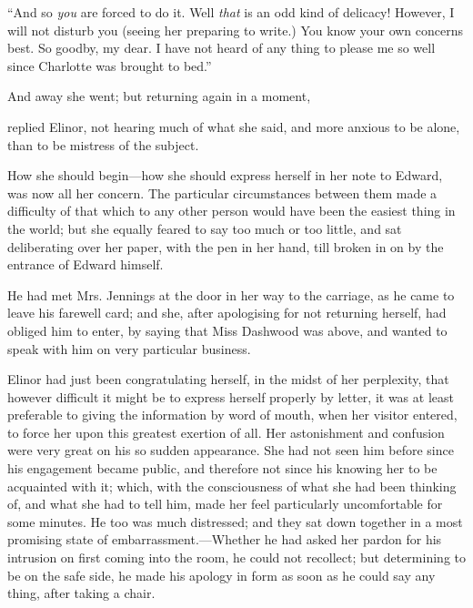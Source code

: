 “And so {\em you} are forced to do it. Well {\em that} is an odd kind of delicacy! However, I will not disturb you (seeing her preparing to write.) You know your own concerns best. So goodby, my dear. I have not heard of any thing to please me so well since Charlotte was brought to bed.”

And away she went; but returning again in a moment,


 replied Elinor, not hearing much of what she said, and more anxious to be alone, than to be mistress of the subject.

How she should begin---how she should express herself in her note to Edward, was now all her concern. The particular circumstances between them made a difficulty of that which to any other person would have been the easiest thing in the world; but she equally feared to say too much or too little, and sat deliberating over her paper, with the pen in her hand, till broken in on by the entrance of Edward himself.

He had met Mrs. Jennings at the door in her way to the carriage, as he came to leave his farewell card; and she, after apologising for not returning herself, had obliged him to enter, by saying that Miss Dashwood was above, and wanted to speak with him on very particular business.

Elinor had just been congratulating herself, in the midst of her perplexity, that however difficult it might be to express herself properly by letter, it was at least preferable to giving the information by word of mouth, when her visitor entered, to force her upon this greatest exertion of all. Her astonishment and confusion were very great on his so sudden appearance. She had not seen him before since his engagement became public, and therefore not since his knowing her to be acquainted with it; which, with the consciousness of what she had been thinking of, and what she had to tell him, made her feel particularly uncomfortable for some minutes. He too was much distressed; and they sat down together in a most promising state of embarrassment.---Whether he had asked her pardon for his intrusion on first coming into the room, he could not recollect; but determining to be on the safe side, he made his apology in form as soon as he could say any thing, after taking a chair.

